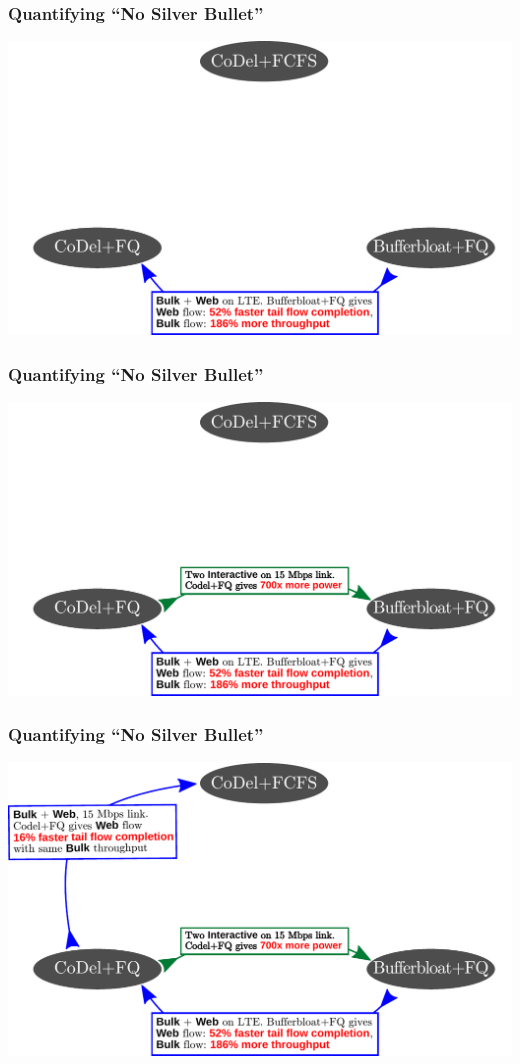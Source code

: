\begin{Large}
\begin{frame}[plain]
\frametitle{Quantifying ``No Silver Bullet''}
\begin{center}
\includegraphics[width=\columnwidth]{fig-5.pdf}
\end{center}
\end{frame}

\begin{frame}[plain]
\frametitle{Quantifying ``No Silver Bullet''}
\begin{center}
\includegraphics[width=\columnwidth]{fig-4.pdf}
\end{center}
\end{frame}

\begin{frame}[plain]
\frametitle{Quantifying ``No Silver Bullet''}
\begin{center}
\includegraphics[width=\columnwidth]{fig-3.pdf}
\end{center}
\end{frame}


\end{Large}
